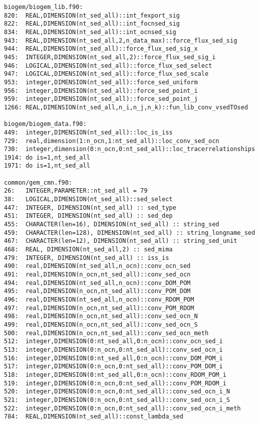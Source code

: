 \documentclass[a4paper,10pt,article]{memoir}
\begin{document}
\begin{small}
\begin{verbatim}
biogem/biogem_lib.f90:
820:  REAL,DIMENSION(nt_sed_all)::int_fexport_sig
822:  REAL,DIMENSION(nt_sed_all)::int_focnsed_sig
834:  REAL,DIMENSION(nt_sed_all)::int_ocnsed_sig
943:  REAL,DIMENSION(nt_sed_all,2,n_data_max)::force_flux_sed_sig
944:  REAL,DIMENSION(nt_sed_all)::force_flux_sed_sig_x
945:  INTEGER,DIMENSION(nt_sed_all,2)::force_flux_sed_sig_i
946:  LOGICAL,DIMENSION(nt_sed_all)::force_flux_sed_select
947:  LOGICAL,DIMENSION(nt_sed_all)::force_flux_sed_scale
953:  integer,DIMENSION(nt_sed_all)::force_sed_uniform
956:  integer,DIMENSION(nt_sed_all)::force_sed_point_i
959:  integer,DIMENSION(nt_sed_all)::force_sed_point_j
1266: REAL,DIMENSION(nt_sed_all,n_i,n_j,n_k)::fun_lib_conv_vsedTOsed

biogem/biogem_data.f90:
449:  integer,DIMENSION(nt_sed_all)::loc_is_iss
729:  real,dimension(1:n_ocn,1:nt_sed_all)::loc_conv_sed_ocn
730:  integer,dimension(0:n_ocn,0:nt_sed_all)::loc_tracerrelationships
1914: do is=1,nt_sed_all
1971: do is=1,nt_sed_all

common/gem_cmn.f90:
26:   INTEGER,PARAMETER::nt_sed_all = 79
38:   LOGICAL,DIMENSION(nt_sed_all)::sed_select
447:  INTEGER, DIMENSION(nt_sed_all) :: sed_type
451:  INTEGER, DIMENSION(nt_sed_all) :: sed_dep
455:  CHARACTER(len=16), DIMENSION(nt_sed_all) :: string_sed
459:  CHARACTER(len=128), DIMENSION(nt_sed_all) :: string_longname_sed
467:  CHARACTER(len=12), DIMENSION(nt_sed_all) :: string_sed_unit
468:  REAL, DIMENSION(nt_sed_all,2) :: sed_mima
479:  INTEGER, DIMENSION(nt_sed_all) :: iss_is
490:  real,DIMENSION(nt_sed_all,n_ocn)::conv_ocn_sed
491:  real,DIMENSION(n_ocn,nt_sed_all)::conv_sed_ocn
494:  real,DIMENSION(nt_sed_all,n_ocn)::conv_DOM_POM
495:  real,DIMENSION(n_ocn,nt_sed_all)::conv_POM_DOM
496:  real,DIMENSION(nt_sed_all,n_ocn)::conv_RDOM_POM
497:  real,DIMENSION(n_ocn,nt_sed_all)::conv_POM_RDOM
498:  real,DIMENSION(n_ocn,nt_sed_all)::conv_sed_ocn_N
499:  real,DIMENSION(n_ocn,nt_sed_all)::conv_sed_ocn_S
500:  real,DIMENSION(n_ocn,nt_sed_all)::conv_sed_ocn_meth
512:  integer,DIMENSION(0:nt_sed_all,0:n_ocn)::conv_ocn_sed_i
513:  integer,DIMENSION(0:n_ocn,0:nt_sed_all)::conv_sed_ocn_i
516:  integer,DIMENSION(0:nt_sed_all,0:n_ocn)::conv_DOM_POM_i
517:  integer,DIMENSION(0:n_ocn,0:nt_sed_all)::conv_POM_DOM_i
518:  integer,DIMENSION(0:nt_sed_all,0:n_ocn)::conv_RDOM_POM_i
519:  integer,DIMENSION(0:n_ocn,0:nt_sed_all)::conv_POM_RDOM_i
520:  integer,DIMENSION(0:n_ocn,0:nt_sed_all)::conv_sed_ocn_i_N
521:  integer,DIMENSION(0:n_ocn,0:nt_sed_all)::conv_sed_ocn_i_S
522:  integer,DIMENSION(0:n_ocn,0:nt_sed_all)::conv_sed_ocn_i_meth
784:  REAL,DIMENSION(nt_sed_all)::const_lambda_sed


\end{verbatim}
\end{small}
\end{document}
